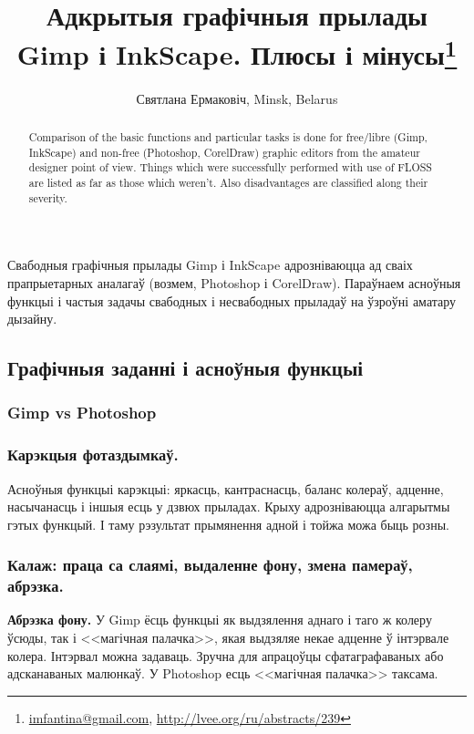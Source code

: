 \documentclass[10pt, a5paper]{article}
\begin{document}
\title{Адкрытыя графічныя прылады Gimp і InkScape. Плюсы і мінусы\footnote{\url{imfantina@gmail.com}, \url{http://lvee.org/ru/abstracts/239}}}
\author{Святлана Ермаковіч, Minsk, Belarus}
\maketitle
\begin{abstract}
Comparison of the basic functions and particular tasks is done for free/libre (Gimp, InkScape) and non-free (Photoshop, CorelDraw) graphic editors from the amateur designer point of view. Things which were successfully performed with use of FLOSS are listed as far as those which weren't. Also disadvantages are classified along their severity. 
\end{abstract}
Свабодныя графічныя прылады Gimp і InkScape адрозніваюцца ад сваіх прапрыетарных аналагаў (возмем, Photoshop і CorelDraw). Параўнаем асноўныя функцыі і частыя задачы свабодных і несвабодных прыладаў на ўзроўні аматару дызайну.

\subsection*{Графічныя заданні і асноўныя функцыі}

\subsubsection*{\textbf{Gimp vs Photoshop}}

\subsubsection*{Карэкцыя фотаздымкаў.}

Асноўныя функцыі карэкцыі: яркасць, кантраснасць, баланс колераў, адценне, насычанасць і іншыя есць у дзвюх прыладах.
Крыху адрозніваюцца алгарытмы гэтых функцый. І таму рэзультат прымянення адной і тойжа можа быць розны.

\subsubsection*{Калаж: праца са слаямі, выдаленне фону, змена памераў, абрэзка.}

\textbf{Абрэзка фону.} У Gimp ёсць функцыі як выдзялення аднаго і таго ж колеру ўсюды, так і <<магічная палачка>>, якая выдзяляе некае адценне ў інтэрвале колера. Інтэрвал можна задаваць. Зручна для апрацоўцы сфатаграфаваных або адсканаваных малюнкаў.
У Photoshop есць <<магічная палачка>> таксама.
\end{document}
